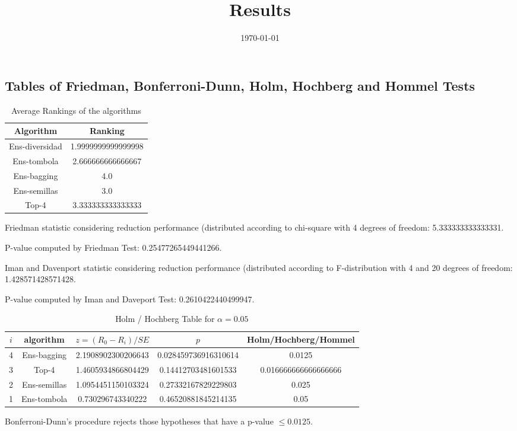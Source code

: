\documentclass[a4paper,10pt]{article}
\title{Results}
\author{}
\date{\today}
\begin{document}
\begin{landscape}
\oddsidemargin 0in \topmargin 0in\maketitle
\section{Tables of Friedman, Bonferroni-Dunn, Holm, Hochberg and Hommel Tests}
\begin{table}[!htp]
\centering
\caption{Average Rankings of the algorithms
}\begin{tabular}{c|c}
Algorithm&Ranking\\
\hline
Ens-diversidad&1.9999999999999998\\
Ens-tombola&2.666666666666667\\
Ens-bagging&4.0\\
Ens-semillas&3.0\\
Top-4&3.333333333333333\\
\end{tabular}
\end{table}


Friedman statistic considering reduction performance (distributed according to chi-square with 4 degrees of freedom: 5.333333333333331.


P-value computed by Friedman Test: 0.25477265449441266.\newline

Iman and Davenport statistic considering reduction performance (distributed according to F-distribution with 4 and 20 degrees of freedom: 1.428571428571428.


P-value computed by Iman and Daveport Test: 0.2610422440499947.\newline

\begin{table}[!htp]
\centering\tiny
\caption{Holm / Hochberg Table for $\alpha=0.05$}
\begin{tabular}{ccccc}
$i$&algorithm&$z=(R_0 - R_i)/SE$&$p$&Holm/Hochberg/Hommel\\
\hline
4&Ens-bagging&2.1908902300206643&0.028459736916310614&0.0125\\
3&Top-4&1.4605934866804429&0.14412703481601533&0.016666666666666666\\
2&Ens-semillas&1.0954451150103324&0.27332167829229803&0.025\\
1&Ens-tombola&0.730296743340222&0.46520881845214135&0.05\\
\hline
\end{tabular}
\end{table}
Bonferroni-Dunn's procedure rejects those hypotheses that have a p-value $\le0.0125$.



\end{landscape}
\end{document}
